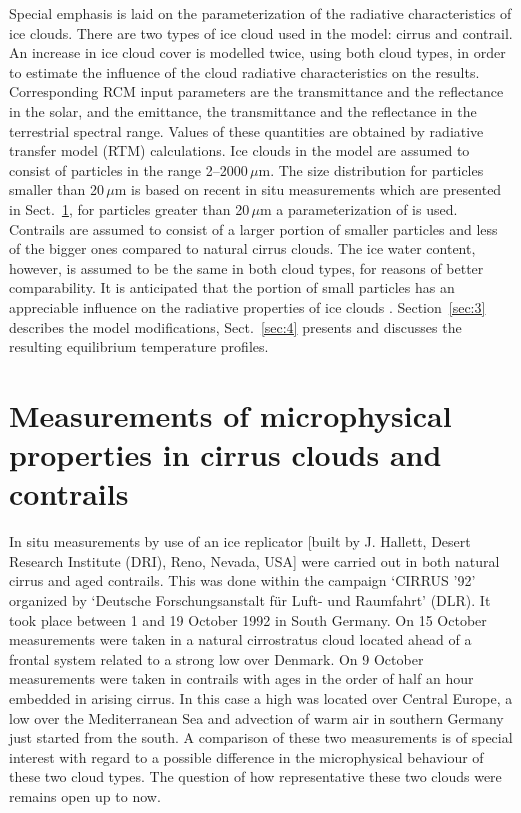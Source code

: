 \documentclass[agp]{svjour}
\begin{document}
Special emphasis is laid on the parameterization of the radiative
characteristics of ice clouds. There are two types of ice cloud used in
the model: cirrus and contrail. An increase in ice cloud cover is
modelled twice, using both cloud types, in order to estimate the
influence of the cloud radiative characteristics on the results.
Corresponding RCM input parameters are the transmittance and the
reflectance in the solar, and the emittance, the transmittance and the
reflectance in the terrestrial spectral range. Values of these
quantities are obtained by radiative transfer model (RTM) calculations.
Ice clouds in the model are assumed to consist of particles in the range
2--2000\,$\mu$m. The size distribution for particles smaller than
20\,$\mu$m is based on recent in situ measurements which are presented
in Sect.~\ref{sec:2}, for particles greater than 20\,$\mu$m a parameterization
of \citet{He84} is used. Contrails are assumed to consist of a larger
portion of smaller particles and less of the bigger ones compared to
natural cirrus clouds. The ice water content, however, is assumed to be
the same in both cloud types, for reasons of better comparability. It is
anticipated that the portion of small particles has an appreciable
influence on the radiative properties of ice clouds \citep{Ar94}.
Section~\ref{sec:3} describes the model modifications, Sect.~\ref{sec:4}
presents and discusses the resulting equilibrium temperature profiles.


\section{Measurements of microphysical properties in cirrus clouds and
contrails}
\label{sec:2}

In situ measurements by use of an ice replicator [built by J. Hallett,
Desert Research Institute (DRI), Reno, Nevada, USA] were carried out in
both natural cirrus and aged contrails. This was done within the
campaign `CIRRUS '92' organized by `Deutsche Forschungsanstalt f\"ur
Luft- und Raumfahrt' (DLR). It took place between 1 and 19 October 1992
in South Germany. On 15 October measurements were taken in a natural
cirrostratus cloud located ahead of a frontal system related to a strong
low over Denmark. On 9 October measurements were taken in contrails with
ages in the order of half an hour embedded in arising cirrus. In this
case a high was located over Central Europe, a low over the
Mediterranean Sea and advection of warm air in southern Germany just
started from the south. A comparison of these two measurements is of
special interest with regard to a possible difference in the
microphysical behaviour of these two cloud types. The question of how
representative these two clouds were remains open up to now.
\end{document}
